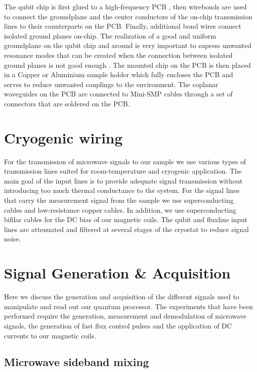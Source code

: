The qubit chip is first glued to a high-frequency PCB , then wirebonds are used to connect the groundplane and the center conductors of the on-chip transmission lines to their counterparts on the PCB. Finally, additional bond wires connect isolated ground planes on-chip. The realization of a good and uniform groundplane on the qubit chip and around is very important to supress unwanted resonance modes that can be created when the connection between isolated ground planes is not good enough . The mounted chip on the PCB is then placed in a Copper or Aluminium sample holder which fully encloses the PCB and serves to reduce unwanted couplings to the environment. The coplanar waveguides on the PCB are connected to Mini-SMP cables through a set of connectors that are soldered on the PCB.

\section{Cryogenic wiring}

For the transmission of microwave signals to our sample we use various types of transmission lines suited for room-temperature and cryogenic application. The main goal of the input lines is to provide adequate signal transmission without introducing too much thermal conductance to the system. For the signal lines that carry the measurement signal from the sample we use superconducting cables  and low-resistance copper cables. In addition, we use superconducting bifilar cables for the DC bias of our magnetic coils. The qubit and fluxline input lines are attenuated and filtered at several stages of the cryostat to reduce signal noise.

\section{Signal Generation \& Acquisition}

Here we discuss the generation and acquisition of the different signals used to manipulate and read out our quantum processor. The experiments that have been performed require the generation, measurement and demodulation of microwave signals, the generation of fast flux control pulses and the application of DC currents to our magnetic coils.

\subsection{Microwave sideband mixing}

